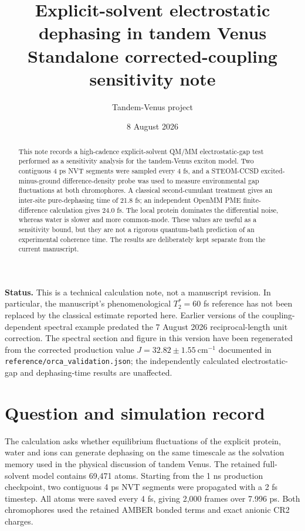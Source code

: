 \documentclass[11pt]{article}
\title{Explicit-solvent electrostatic dephasing in tandem Venus\\
\large Standalone corrected-coupling sensitivity note}
\author{Tandem-Venus project}
\date{8 August 2026}
\newcommand{\wn}{\mathrm{cm}^{-1}}
\newcommand{\Ttwo}{T_2^{*}}
\begin{document}
\maketitle

\begin{abstract}
This note records a high-cadence explicit-solvent QM/MM electrostatic-gap test
performed as a sensitivity analysis for the tandem-Venus exciton model.  Two
contiguous 4 ps NVT segments were sampled every 4 fs, and a STEOM-CCSD
excited-minus-ground difference-density probe was used to measure environmental
gap fluctuations at both chromophores.  A classical second-cumulant treatment
gives an inter-site pure-dephasing time of 21.8 fs; an independent OpenMM PME
finite-difference calculation gives 24.0 fs.  The local protein dominates the
differential noise, whereas water is slower and more common-mode.  These values
are useful as a sensitivity bound, but they are not a rigorous quantum-bath
prediction of an experimental coherence time.  The results are deliberately
kept separate from the current manuscript.
\end{abstract}

\noindent\colorbox{yellow!16}{\parbox{0.96\linewidth}{
\textbf{Status.} This is a technical calculation note, not a manuscript
revision.  In particular, the manuscript's phenomenological $\Ttwo=60$ fs
reference has not been replaced by the classical estimate reported here.
Earlier versions of the coupling-dependent spectral example predated the
7 August 2026 reciprocal-length unit correction.  The spectral section and
figure in this version have been regenerated from the corrected production
value $J=32.82\pm1.55\ \wn$ documented in
\texttt{reference/orca\_validation.json}; the independently calculated
electrostatic-gap and dephasing-time results are unaffected.}}

\section{Question and simulation record}

The calculation asks whether equilibrium fluctuations of the explicit protein,
water and ions can generate dephasing on the same timescale as the solvation
memory used in the physical discussion of tandem Venus.  The retained
full-solvent model contains 69,471 atoms.  Starting from the 1 ns production
checkpoint, two contiguous 4 ps NVT segments were propagated with a 2 fs
timestep.  All atoms were saved every 4 fs, giving 2,000 frames over 7.996 ps.
Both chromophores used the retained AMBER bonded terms and exact anionic CR2
charges.
\end{document}
